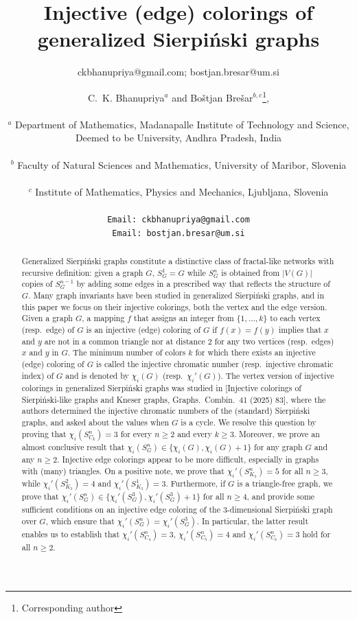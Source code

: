 \documentclass{article}
\title{Injective (edge) colorings of generalized Sierpi\'{n}ski graphs}
\author{ckbhanupriya@gmail.com; bostjan.bresar@um.si}
\author{C.~K. Bhanupriya$^a$ and Bo\v{s}tjan Bre\v{s}ar$^{b,c}$\footnote{Corresponding author}, \\ \\
$^a$ Department of Mathematics, Madanapalle Institute of Technology and Science, \\Deemed to be University, Andhra Pradesh, India \\
\\
$^b$ Faculty of Natural Sciences and Mathematics, University of Maribor, Slovenia \\
\\
$^c$ Institute of Mathematics, Physics and Mechanics, Ljubljana, Slovenia\\
\\
\small \tt Email: ckbhanupriya@gmail.com\\
\small \tt Email: bostjan.bresar@um.si \\
}
\date{}
\begin{document}
\maketitle

\begin{abstract}
Generalized Sierpi\'{n}ski graphs constitute a distinctive class of fractal-like networks with recursive definition: given a graph $G$, $S_G^1=G$ while $S_G^n$ is obtained from $|V(G)|$ copies of $S_G^{n-1}$ by adding some edges in a prescribed way that reflects the structure of $G$. Many graph invariants have been studied in generalized Sierpi\'{n}ski graphs, and in this paper we focus on their injective colorings, both the vertex and the edge version. Given a graph $G$, a mapping $f$ that assigns an integer from $\{1,\ldots,k\}$ to each vertex (resp.\ edge) of $G$ is an injective (edge) coloring of $G$ if $f(x)=f(y)$ implies that $x$ and $y$ are not in a common triangle nor at distance $2$ for any two vertices (resp.\ edges) $x$ and $y$ in $G$.
The minimum number of colors $k$ for which there exists an injective (edge) coloring of $G$ is called the injective chromatic number (resp.\ injective chromatic index) of $G$ and is denoted by $\chi_i(G)$ (resp.\ $\chi_i'(G)$). The vertex version of injective colorings in generalized Sierpi\'{n}ski graphs was studied in [Injective colorings of Sierpi\'nski-like graphs and Kneser graphs,
Graphs.\ Combin.\ 41 (2025) 83], where the authors determined the injective chromatic numbers of the (standard) Sierpi\'{n}ski graphs,
and asked about the values when $G$ is a cycle. We resolve this question by proving that $\chi_i(S_{C_k}^n)=3$ for every $n\ge 2$ and every $k\ge 3$. Moreover, we prove an almost conclusive result that $\chi_i(S_G^n)\in \{\chi_i(G),\chi_i(G)+1\}$  for any graph $G$ and any $n\ge 2$. Injective edge colorings appear to be more difficult, especially in graphs with (many) triangles. On a positive note, we prove that $\chi_i'(S_{K_3}^n)=5$ for all $n\ge 3$, while $\chi_i'(S_{K_3}^2)=4$ and $\chi_i'(S_{K_3}^1)=3$. Furthermore, if $G$ is a triangle-free graph, we prove that $\chi_i'(S_G^n)\in \{\chi_i'(S_G^3),\chi_i'(S_G^3)+1\}$ for all $n\ge 4$, and provide some sufficient conditions on an injective edge coloring of the 3-dimensional Sierpi\'{n}ski graph over $G$, which ensure that $\chi_i'(S_G^n)=\chi_i'(S_G^3)$. In particular, the latter result enables us to establish that $\chi_i'(S_{C_4}^n)=3$, $\chi_i'(S_{C_5}^n)=4$ and $\chi_i'(S_{C_6}^n)=3$ hold for all $n\ge 2$.     
\end{abstract}
\end{document}
